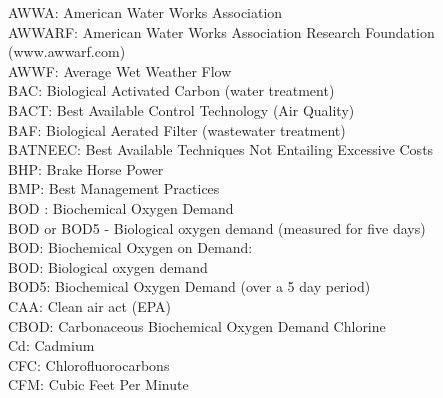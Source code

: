 \documentclass{article}
\begin{document}
AWWA:  American Water Works Association
\vspace{0.3cm}\\
AWWARF:  American Water Works Association Research Foundation (www.awwarf.com)
\vspace{0.3cm}\\
AWWF:  Average Wet Weather Flow
\vspace{0.3cm}\\
BAC:  Biological Activated Carbon (water treatment)
\vspace{0.3cm}\\
BACT:  Best Available Control Technology (Air Quality)
\vspace{0.3cm}\\
BAF:  Biological Aerated Filter (wastewater treatment)
\vspace{0.3cm}\\
BATNEEC:  Best Available Techniques Not Entailing Excessive Costs
\vspace{0.3cm}\\
BHP:  Brake Horse Power
\vspace{0.3cm}\\
BMP:  Best Management Practices
\vspace{0.3cm}\\
BOD :  Biochemical Oxygen Demand
\vspace{0.3cm}\\
BOD or BOD5 - Biological oxygen demand (measured for five days)
\vspace{0.3cm}\\
BOD:  Biochemical Oxygen on Demand:  
\vspace{0.3cm}\\
BOD:  Biological oxygen demand
\vspace{0.3cm}\\
BOD5:  Biochemical Oxygen Demand (over a 5 day period)
\vspace{0.3cm}\\
CAA:  Clean air act (EPA)
\vspace{0.3cm}\\
CBOD:  Carbonaceous Biochemical Oxygen Demand Chlorine
\vspace{0.3cm}\\
Cd:  Cadmium
\vspace{0.3cm}\\
CFC:  Chlorofluorocarbons
\vspace{0.3cm}\\
CFM:  Cubic Feet Per Minute
\vspace{0.3cm}\\
\end{document}
